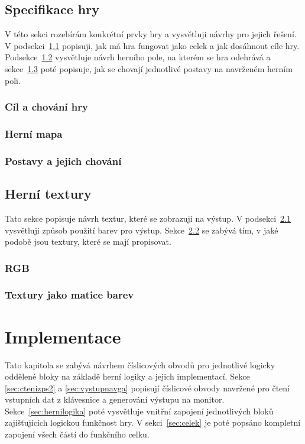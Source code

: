 \documentclass{report}
\begin{document}
\section{Specifikace hry}\label{sec:specifikacehry}
V této sekci rozebírám konkrétní prvky hry a vysvětluji návrhy pro jejich řešení. V podsekci~\ref{sec:cilachovani} popisuji, jak má hra fungovat jako celek a jak dosáhnout cíle hry. Podsekce~\ref{sec:mapajakomrizka} vysvětluje návrh herního pole, na kterém se hra odehrává a sekce~\ref{sec:postavyachovani} poté popisuje, jak se chovají jednotlivé postavy na navrženém herním poli.

\subsection{Cíl a chování hry}\label{sec:cilachovani}
\subsection{Herní mapa}\label{sec:mapajakomrizka}
\subsection{Postavy a jejich chování}\label{sec:postavyachovani}

\section{Herní textury}\label{sec:hernitextury}
Tato sekce popisuje návrh textur, které se zobrazují na výstup. V podsekci~\ref{sec:RGB} vysvětluji způsob použití barev pro výstup. Sekce~\ref{sec:texturyjakomatice} se zabývá tím, v jaké podobě jsou textury, které se mají propisovat. 
\subsection{RGB}\label{sec:RGB}
\subsection{Textury jako matice barev}\label{sec:texturyjakomatice}

\chapter{Implementace}
Tato kapitola se zabývá návrhem číslicových obvodů pro jednotlivé logicky oddělené bloky na základě herní logiky a jejich implementací. Sekce \ref{sec:ctenizps2} a \ref{sec:vystupnavga} popisují číslicové obvody navržené pro čtení vstupních dat z klávesnice a generování výstupu na monitor. Sekce~\ref{sec:hernilogika} poté vysvětluje vnitřní zapojení jednotlivých bloků zajišťujících logickou funkčnost hry. V sekci~\ref{sec:celek} je poté popsáno kompletní zapojení všech částí do funkčního celku.
\end{document}
